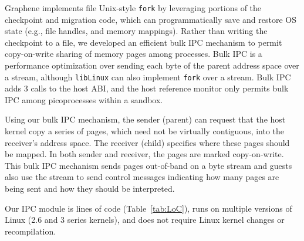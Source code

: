 Graphene implements file Unix-style {\tt fork}
by leveraging portions of the checkpoint and migration code,
which can programmatically save and restore OS state (e.g., file handles, and memory mappings).
Rather than writing the checkpoint to a file, 
we developed an efficient bulk IPC mechanism to 
permit copy-on-write sharing of memory pages among processes.
Bulk IPC is a performance optimization over sending each byte of the parent address
space over a stream, although {\tt libLinux} can also implement {\tt fork}
over a stream.
Bulk IPC adds 3 calls to the host ABI,
and the host reference monitor only permits bulk IPC among
picoprocesses within a sandbox.



Using our bulk IPC mechanism,
the sender (parent) can request that the host kernel copy
a series of pages, which need not be virtually contiguous,
into the receiver's address space.
The receiver (child) specifies where these pages should be mapped.
In both sender and receiver, the pages are marked copy-on-write.  
This bulk IPC mechanism sends pages out-of-band on a byte stream and guests also use the stream to send control messages 
indicating 
how many pages are being sent and how they should be interpreted.

Our IPC module is \gipclines{} lines of code (Table~\ref{tab:LoC}), 
runs on multiple versions of Linux (2.6 and 3 series kernels), and
does not require
Linux kernel changes or recompilation.


\begin{comment}
A critical challenge in developing a Linux library OS was implementing 
handle inheritance in the guest.  In some cases, 
handles are easy to reproduce: an open file can simply be reopened in the child,
and the cursor offset adjusted (note that file handle offsets are a library abstraction
implemented over a memory mapped file).
Pipes, however, are not easily recreated without host support.
\end{comment}

